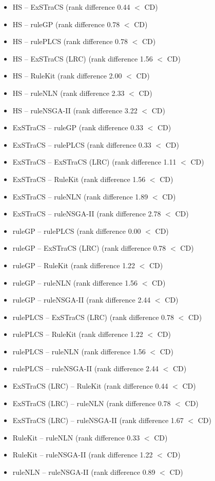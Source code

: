 \begin{itemize}[nosep]
  \item HS -- ExSTraCS (rank difference 0.44 $<$ CD)
  \item HS -- ruleGP (rank difference 0.78 $<$ CD)
  \item HS -- rulePLCS (rank difference 0.78 $<$ CD)
  \item HS -- ExSTraCS (LRC) (rank difference 1.56 $<$ CD)
  \item HS -- RuleKit (rank difference 2.00 $<$ CD)
  \item HS -- ruleNLN (rank difference 2.33 $<$ CD)
  \item HS -- ruleNSGA-II (rank difference 3.22 $<$ CD)
  \item ExSTraCS -- ruleGP (rank difference 0.33 $<$ CD)
  \item ExSTraCS -- rulePLCS (rank difference 0.33 $<$ CD)
  \item ExSTraCS -- ExSTraCS (LRC) (rank difference 1.11 $<$ CD)
  \item ExSTraCS -- RuleKit (rank difference 1.56 $<$ CD)
  \item ExSTraCS -- ruleNLN (rank difference 1.89 $<$ CD)
  \item ExSTraCS -- ruleNSGA-II (rank difference 2.78 $<$ CD)
  \item ruleGP -- rulePLCS (rank difference 0.00 $<$ CD)
  \item ruleGP -- ExSTraCS (LRC) (rank difference 0.78 $<$ CD)
  \item ruleGP -- RuleKit (rank difference 1.22 $<$ CD)
  \item ruleGP -- ruleNLN (rank difference 1.56 $<$ CD)
  \item ruleGP -- ruleNSGA-II (rank difference 2.44 $<$ CD)
  \item rulePLCS -- ExSTraCS (LRC) (rank difference 0.78 $<$ CD)
  \item rulePLCS -- RuleKit (rank difference 1.22 $<$ CD)
  \item rulePLCS -- ruleNLN (rank difference 1.56 $<$ CD)
  \item rulePLCS -- ruleNSGA-II (rank difference 2.44 $<$ CD)
  \item ExSTraCS (LRC) -- RuleKit (rank difference 0.44 $<$ CD)
  \item ExSTraCS (LRC) -- ruleNLN (rank difference 0.78 $<$ CD)
  \item ExSTraCS (LRC) -- ruleNSGA-II (rank difference 1.67 $<$ CD)
  \item RuleKit -- ruleNLN (rank difference 0.33 $<$ CD)
  \item RuleKit -- ruleNSGA-II (rank difference 1.22 $<$ CD)
  \item ruleNLN -- ruleNSGA-II (rank difference 0.89 $<$ CD)
\end{itemize}
